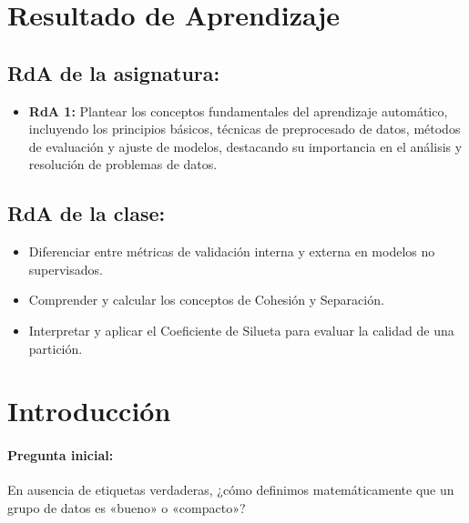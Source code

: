 \documentclass[a4,11pt]{aleph-notas}
\begin{document}
\encabezado

\section*{Resultado de Aprendizaje}

\subsection*{RdA de la asignatura:}
\begin{itemize}[leftmargin=*]
    \item \textbf{RdA 1:} Plantear los conceptos fundamentales del aprendizaje automático, incluyendo los principios básicos, técnicas de preprocesado de datos, métodos de evaluación y ajuste de modelos, destacando su importancia en el análisis y resolución de problemas de datos.
\end{itemize}

\subsection*{RdA de la clase:}
\begin{itemize}[leftmargin=*]
    \item Diferenciar entre métricas de validación interna y externa en modelos no supervisados.
    \item Comprender y calcular los conceptos de Cohesión y Separación.
    \item Interpretar y aplicar el Coeficiente de Silueta para evaluar la calidad de una partición.
\end{itemize}

\section*{Introducción}

\paragraph{Pregunta inicial:} 
En ausencia de etiquetas verdaderas, ¿cómo definimos matemáticamente que un grupo de datos es «bueno» o «compacto»?
\end{document}
